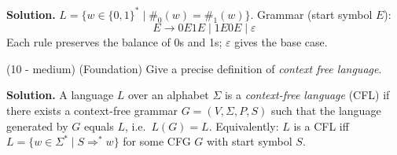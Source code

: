 \documentclass[12pt, letterpaper]{article}
\begin{document}
{	\textbf{Solution.} $L = \{ w \in \{0,1\}^* \mid \#_0(w) = \#_1(w) \}$. Grammar (start symbol $E$):
	\[
	E \to 0E1E \mid 1E0E \mid \varepsilon
	\]
	Each rule preserves the balance of 0s and 1s; $\varepsilon$ gives the base case.

	\item (10 - medium) (Foundation) Give a precise definition of {\em context free language}. 

	\textbf{Solution.} A language $L$ over an alphabet $\Sigma$ is a \emph{context-free language} (CFL) if there exists a context-free grammar $G = (V, \Sigma, P, S)$ such that the language generated by $G$ equals $L$, i.e.\ $L(G) = L$. Equivalently: $L$ is a CFL iff $L = \{ w \in \Sigma^* \mid S \Rightarrow^* w \}$ for some CFG $G$ with start symbol $S$.
}
\end{document}
